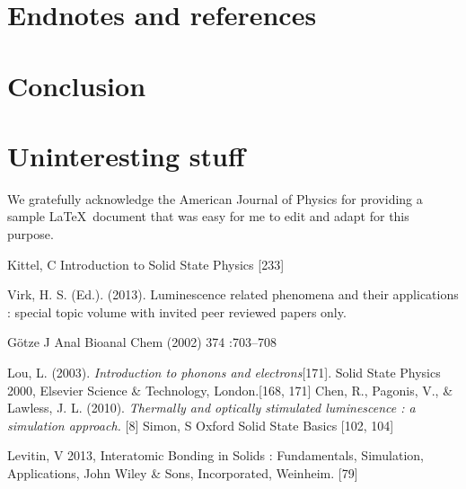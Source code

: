 \documentclass[prl,onecolumn]{revtex4-1}  %
\begin{document}
\section{Endnotes and references}


\section{Conclusion}



\appendix*   %

\section{Uninteresting stuff}



\begin{acknowledgments}

We gratefully acknowledge the American Journal of Physics for providing a sample
\LaTeX\ document that was easy for me to edit and adapt for this purpose. 

\end{acknowledgments}


\begin{thebibliography}{99}



 Kittel, C Introduction to Solid State Physics [233]

 Virk, H. S. (Ed.). (2013). Luminescence related phenomena and their applications : special topic volume with invited peer reviewed papers only. 

 G\"otze J  Anal Bioanal Chem (2002) 374 :703–708

Lou, L. (2003). \textit{Introduction to phonons and electrons}[171].
 Solid State Physics 2000, Elsevier Science \& Technology, London.[168, 171]
 Chen, R., Pagonis, V., \& Lawless, J. L. (2010). \textit{Thermally and optically stimulated luminescence : a simulation approach. }[8]
 Simon, S Oxford Solid State Basics [102, 104]

 Levitin, V 2013, Interatomic Bonding in Solids : Fundamentals, Simulation, Applications, John Wiley \& Sons, Incorporated, Weinheim. [79]

\end{thebibliography}
\end{document}
